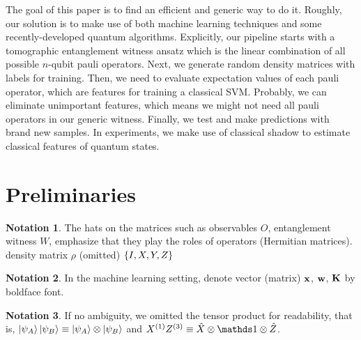\documentclass[
reprint,
aps,
pra,
floatfix,
]{revtex4-2}
\theoremstyle{plain}
\theoremstyle{definition}
\newtheorem{notation}{Notation}
\newcommand{\ew}{W}
\newcommand{\ob}{O}
\newcommand{\px}{X}
\newcommand{\pz}{Z}
\newcommand{\hamiltonian}{\hat{H}}
\newcommand{\dm}{\rho}
\begin{document}
The goal of this paper is to find an efficient and generic way to do it. Roughly, our solution is to make use of both machine learning techniques and some recently-developed quantum algorithms.
Explicitly, our pipeline starts with a tomographic entanglement witness ansatz which is the linear combination of all possible $n$-qubit pauli operators. 
Next, we generate random density matrices with labels for training. 
Then, we need to evaluate expectation values of each pauli operator, which are features for training a classical SVM. 
Probably, we can eliminate unimportant features, which means we might not need all pauli operators in our generic witness. 
Finally, we test and make predictions with brand new samples. 
In experiments, we make use of classical shadow \cite{huangPredictingManyProperties2020} to estimate classical features of quantum states.

\section{Preliminaries}
\begin{notation}
	The hats on the matrices such as
	observables $\ob$, entanglement witness $\ew$, 
	emphasize that they play the roles of operators (Hermitian matrices).
	density matrix $\dm$ (omitted)
	$\qty{I,X,Y,Z}$
\end{notation}
\begin{notation}
	In the machine learning setting,
	denote vector (matrix) $\vb{x}$, $\vb{w}$, $\vb{K}$ by boldface font.
\end{notation}
\begin{notation}
	If no ambiguity,
	we omitted the tensor product for readability,
	that is,
	$\ket{\psi_A}\ket{\psi_B}\equiv \ket{\psi_A}\otimes \ket{\psi_B}$ 
	and $\px^{(1)}\pz^{(3)} \equiv \hat{X} \otimes \identity \otimes \hat{Z}$.
\end{notation}
\end{document}
